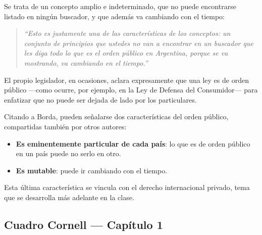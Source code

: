\documentclass[12pt,oneside]{book}
\begin{document}
Se trata de un concepto amplio e indeterminado, que no puede encontrarse listado en ningún buscador, y que además va cambiando con el tiempo:

\begin{quote}
\itshape
``Esto es justamente una de las características de los conceptos: un conjunto de principios que ustedes no van a encontrar en un buscador que les diga todo lo que es el orden público en Argentina, porque se va mostrando, va cambiando en el tiempo.''
\end{quote}

El propio legislador, en ocasiones, aclara expresamente que una ley es de orden público —como ocurre, por ejemplo, en la Ley de Defensa del Consumidor— para enfatizar que no puede ser dejada de lado por los particulares.

Citando a Borda, pueden señalarse dos características del orden público, compartidas también por otros autores:

\begin{itemize}
    \item \textbf{Es eminentemente particular de cada país}: lo que es de orden público en un país puede no serlo en otro.
    \item \textbf{Es mutable}: puede ir cambiando con el tiempo.
\end{itemize}

Esta última característica se vincula con el derecho internacional privado, tema que se desarrolla más adelante en la clase.

\subsection*{Cuadro Cornell — Capítulo 1}
\end{document}
